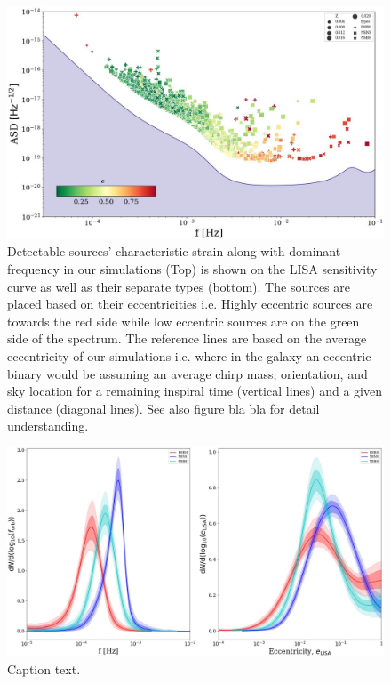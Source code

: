 \documentclass[journal, twocolumn]{IEEEtran}
\begin{document}
    \begin{figure}[!ht]
        \centering
        \includegraphics[width=\columnwidth]{images/first}
        \caption{\label{first}Detectable sources' characteristic strain along with dominant frequency in our simulations (Top) is shown on the LISA sensitivity curve as well as their separate types (bottom). The sources are placed based on their eccentricities i.e. Highly eccentric sources are towards the red side while low eccentric sources are on the green side of the spectrum. The reference lines are based on the average eccentricity of our simulations i.e. where in the galaxy an eccentric binary would be assuming an average chirp mass, orientation, and sky location for a remaining inspiral time (vertical lines) and a given distance (diagonal lines). See also figure bla bla for detail understanding.}\label{detect} %
    \end{figure}
    \begin{figure}
        \includegraphics[width=\columnwidth]{images/second}
        \caption{Caption text.}\label{fig:freq} %
    \end{figure}
\end{document}
